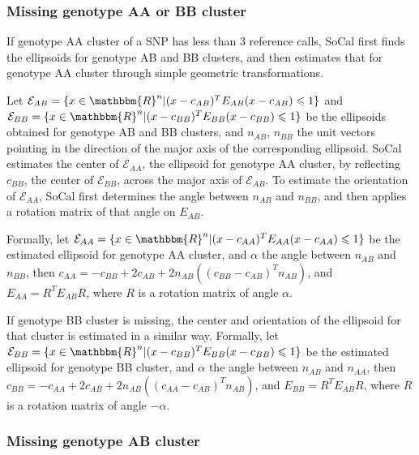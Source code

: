 \documentclass{scrartcl}
\begin{document}
\subsubsection{Missing genotype AA or BB cluster}

\par
If genotype AA cluster of a SNP has less than 3 reference calls, SoCal
first finds the ellipsoids for genotype AB and BB clusters, and then
estimates that for genotype AA cluster through simple geometric
transformations.

\par
Let $\mathcal{E}_{AB}=
\{x \in \mathbbm{R}^{n}|(x-c_{AB})^TE_{AB}(x-c_{AB}) \leqslant 1\}$
and $\mathcal{E}_{BB}=
\{x \in \mathbbm{R}^{n}|(x-c_{BB})^TE_{BB}(x-c_{BB}) \leqslant 1\}$
be the ellipsoids obtained for genotype AB and BB clusters,
and $n_{AB}$, $n_{BB}$ the unit vectors pointing in the direction of
the major axis of the corresponding ellipsoid.
SoCal estimates the center of $\mathcal{E}_{AA}$, the ellipsoid for genotype
AA cluster, by reflecting $c_{BB}$, the center of $\mathcal{E}_{BB}$, across
the major axis of $\mathcal{E}_{AB}$.
To estimate the orientation of $\mathcal{E}_{AA}$, SoCal first determines the
angle between $n_{AB}$ and $n_{BB}$, and then applies a rotation matrix of
that angle on $E_{AB}$.

\par
Formally, let $\mathcal{E}_{AA}=
\{x \in \mathbbm{R}^{n}|(x-c_{AA})^TE_{AA}(x-c_{AA}) \leqslant 1\}$ be the
estimated ellipsoid for genotype AA cluster, and $\alpha$ the angle between
$n_{AB}$ and $n_{BB}$, then
$c_{AA}=-c_{BB}+2c_{AB}+2n_{AB}((c_{BB}-c_{AB})^{T}n_{AB})$, and
$E_{AA}=R^{T}E_{AB}R$, where $R$ is a rotation matrix of angle $\alpha$.

\par
If genotype BB cluster is missing, the center and orientation of the
ellipsoid for that cluster is estimated in a similar way.
Formally, let $\mathcal{E}_{BB}=
\{x \in \mathbbm{R}^{n}|(x-c_{BB})^TE_{BB}(x-c_{BB}) \leqslant 1\}$ be the
estimated ellipsoid for genotype BB cluster, and $\alpha$ the angle between
$n_{AB}$ and $n_{AA}$, then
$c_{BB}=-c_{AA}+2c_{AB}+2n_{AB}((c_{AA}-c_{AB})^{T}n_{AB})$, and
$E_{BB}=R^{T}E_{AB}R$, where $R$ is a rotation matrix of angle $-\alpha$.

\subsubsection{Missing genotype AB cluster}
\end{document}
